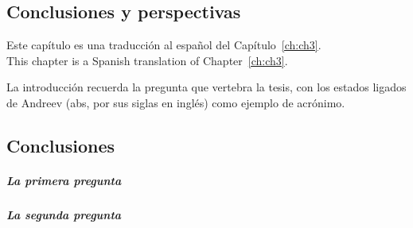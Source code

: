\documentclass[../main]{subfiles}
\begin{document}
\lipsum[8][1-5]

\sectionclose
\lipsum[9][1-3]


\begin{otherlanguage}{spanish}
\chapter*{Conclusiones y perspectivas}
\label{ch:ch3_es}

\vfill
\begin{disclaimer}
    Este capítulo es una traducción al español del Capítulo~\ref{ch:ch3}.\\
    \indent\foreignlanguage{english}{This chapter is a Spanish translation of Chapter~\ref{ch:ch3}.}
\end{disclaimer}

\clearpage

La introducción recuerda la pregunta que vertebra la tesis, con los estados ligados de Andreev (\acrshort{abs}, por sus siglas en inglés) como ejemplo de acrónimo.
\lipsum[1][1-6]

\section*{Conclusiones}

\paragraph{La primera pregunta}
\lipsum[2][1-6]

\paragraph{La segunda pregunta}
\lipsum[3][1-6]


\end{otherlanguage}
\end{document}
